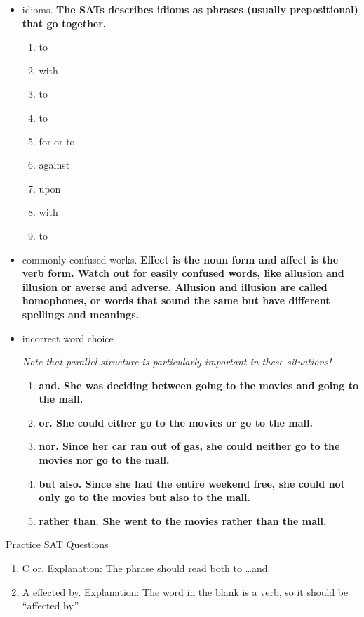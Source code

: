 \begin{itemize}
\item idioms. \textbf{The SATs describes idioms as phrases (usually prepositional) that go together.}

\begin{enumerate}
\item to
\item with
\item to
\item to
\item for or to
\item against
\item upon
\item with
\item to
\end{enumerate}

\item commonly confused works. \textbf{Effect is the noun form and affect is the verb form. Watch out for easily confused words, like allusion and illusion or averse and adverse.  Allusion and illusion are called homophones, or words that sound the same but have different spellings and meanings.}

\item incorrect word choice

\bigskip 
\textit{Note that parallel structure is particularly important in these situations!}

\begin{enumerate}
\item\textbf{ and. She was deciding between going to the movies and going to the mall.}

\item \textbf{or. She could either go to the movies or go to the mall.}

\item \textbf{nor. Since her car ran out of gas, she could neither go to the movies nor go to the mall.}

\item \textbf{but also. Since she had the entire weekend free, she could not only go to the movies but also to the mall.}

\item \textbf{rather than. She went to the movies rather than the mall.}
\end{enumerate}
\end{itemize}

\bigskip
Practice SAT Questions
\begin{enumerate}
\item C or. Explanation: The phrase should read both to \ldots and.

\item A effected by. Explanation: The word in the blank is a verb, so it should be ``affected by.''
\end{enumerate}

